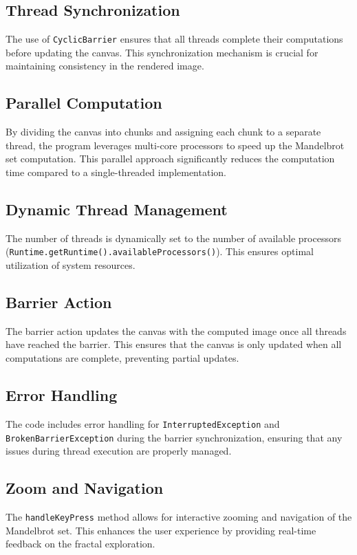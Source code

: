 \documentclass[sigconf]{acmart}
\begin{document}
\subsection{Thread Synchronization}
The use of \texttt{CyclicBarrier} ensures that all threads complete their computations before updating the canvas. This synchronization mechanism is crucial for maintaining consistency in the rendered image.

\subsection{Parallel Computation}
By dividing the canvas into chunks and assigning each chunk to a separate thread, the program leverages multi-core processors to speed up the Mandelbrot set computation. This parallel approach significantly reduces the computation time compared to a single-threaded implementation.

\subsection{Dynamic Thread Management}
The number of threads is dynamically set to the number of available processors (\texttt{Runtime.getRuntime().availableProcessors()}). This ensures optimal utilization of system resources.

\subsection{Barrier Action}
The barrier action updates the canvas with the computed image once all threads have reached the barrier. This ensures that the canvas is only updated when all computations are complete, preventing partial updates.

\subsection{Error Handling}
The code includes error handling for \texttt{InterruptedException} and \texttt{BrokenBarrierException} during the barrier synchronization, ensuring that any issues during thread execution are properly managed.

\subsection{Zoom and Navigation}
The \texttt{handleKeyPress} method allows for interactive zooming and navigation of the Mandelbrot set. This enhances the user experience by providing real-time feedback on the fractal exploration.
\end{document}
